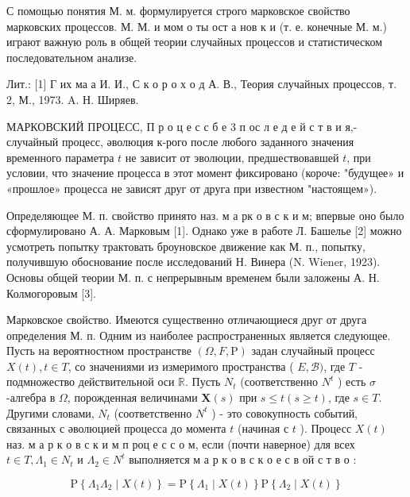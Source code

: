 \documentclass[10pt]{article}
\begin{document}
С помощью понятия М. м. формулируется строго марковское свойство марковских процессов. М. М. и мом о ты ост а нов к и (т. е. конечные М. м.) играют важную роль в общей теории случайных процессов и статистическом последовательном анализе.



Лит.: [1] Г их ма а И. И., С к о р о х о д А. В., Теория случайных процессов, т. 2, М., 1973. A. Н. Ширяев.



МАРКОВСКИЙ ПРОЦЕСС, П р о ц е с с б е 3 п ос л е д е й с т в и я,- случайный процесс, әволюция к-рого после любого заданного значения временного параметра $t$ не зависит от эволюции, предшествовавшей $t$, при условии, что значение процесса в этот момент фиксировано (короче: "будущее» и «прошлое» процесса не зависят друг от друга при известном "настоящем»).



Определяющее М. п. свойство принято наз. м а рк о в с к и м; впервые оно было сформулировано А. А. Марковым [1]. Однако уже в работе Л. Башелье [2] можно усмотреть попытку трактовать броуновское движение как М. п., попытку, получившую обоснование после исследований Н. Винера (N. Wiener, 1923). Основы общей теории М. п. с непрерывным временем были заложены А. Н. Колмогоровым [3].



Марковское свойство. Имеются существенно отличающиеся друг от друга определения М. п. Одним из наиболее распространенных является следующее. Пусть на вероятностном пространстве $(\Omega, F, \mathrm{P})$ задан случайный процесс $X(t), t \in T$, со значениями из измеримого пространства ( $E, \mathscr{B})$, где $T$ - подмножество действительной оси $\mathbb{R}$. Пусть $N_{t}$ (соответственно $N^{t}$ ) есть $\sigma$-алгебра в $\Omega$, порожденная величинами $\boldsymbol{X}(s)$ при $s \leqslant t(s \geqslant t)$, где $s \in T$. Другими словами, $N_{t}$ (соответственно $N^{t}$ ) - это совокупность событий, связанных с әволюцией процесса до момента $t$ (начиная с $t$ ). Процесс $X(t)$ наз. м а р к о в с к и м п роц е с с о м, если (почти наверное) для всех $t \in T, \Lambda_{1} \in N_{t}$ и $\Lambda_{2} \in N^{t}$ выполняется м а р к о в с к о е с в ой с т в о :



\[

\mathrm{P}\left\{\Lambda_{1} \Lambda_{2} \mid X(t)\right\}=\mathrm{P}\left\{\Lambda_{1} \mid X(t)\right\} \mathrm{P}\left\{\Lambda_{2} \mid X(t)\right\}

\]
\end{document}
